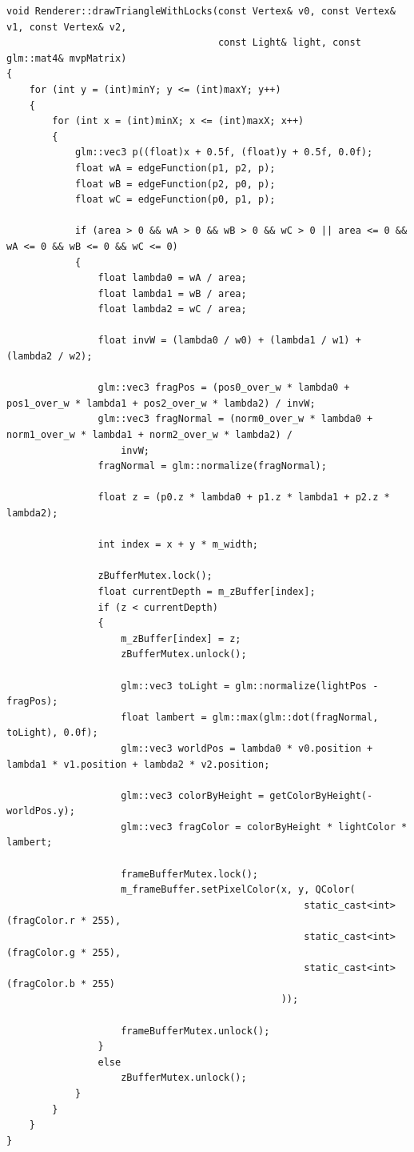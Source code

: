 \begin{lstlisting}[style=cpp, label=lst:rastr, caption={Реализация функции renderTriangle}]
void Renderer::drawTriangleWithLocks(const Vertex& v0, const Vertex& v1, const Vertex& v2,
                                     const Light& light, const glm::mat4& mvpMatrix)
{
    for (int y = (int)minY; y <= (int)maxY; y++)
    {
        for (int x = (int)minX; x <= (int)maxX; x++)
        {
            glm::vec3 p((float)x + 0.5f, (float)y + 0.5f, 0.0f);
            float wA = edgeFunction(p1, p2, p);
            float wB = edgeFunction(p2, p0, p);
            float wC = edgeFunction(p0, p1, p);

            if (area > 0 && wA > 0 && wB > 0 && wC > 0 || area <= 0 && wA <= 0 && wB <= 0 && wC <= 0)
            {
                float lambda0 = wA / area;
                float lambda1 = wB / area;
                float lambda2 = wC / area;

                float invW = (lambda0 / w0) + (lambda1 / w1) + (lambda2 / w2);

                glm::vec3 fragPos = (pos0_over_w * lambda0 + pos1_over_w * lambda1 + pos2_over_w * lambda2) / invW;
                glm::vec3 fragNormal = (norm0_over_w * lambda0 + norm1_over_w * lambda1 + norm2_over_w * lambda2) /
                    invW;
                fragNormal = glm::normalize(fragNormal);

                float z = (p0.z * lambda0 + p1.z * lambda1 + p2.z * lambda2);

                int index = x + y * m_width;

                zBufferMutex.lock();
                float currentDepth = m_zBuffer[index];
                if (z < currentDepth)
                {
                    m_zBuffer[index] = z;
                    zBufferMutex.unlock();

                    glm::vec3 toLight = glm::normalize(lightPos - fragPos);
                    float lambert = glm::max(glm::dot(fragNormal, toLight), 0.0f);
                    glm::vec3 worldPos = lambda0 * v0.position + lambda1 * v1.position + lambda2 * v2.position;

                    glm::vec3 colorByHeight = getColorByHeight(-worldPos.y);
                    glm::vec3 fragColor = colorByHeight * lightColor * lambert;

                    frameBufferMutex.lock();
                    m_frameBuffer.setPixelColor(x, y, QColor(
                                                    static_cast<int>(fragColor.r * 255),
                                                    static_cast<int>(fragColor.g * 255),
                                                    static_cast<int>(fragColor.b * 255)
                                                ));

                    frameBufferMutex.unlock();
                }
                else
                    zBufferMutex.unlock();
            }
        }
    }
}
\end{lstlisting}

